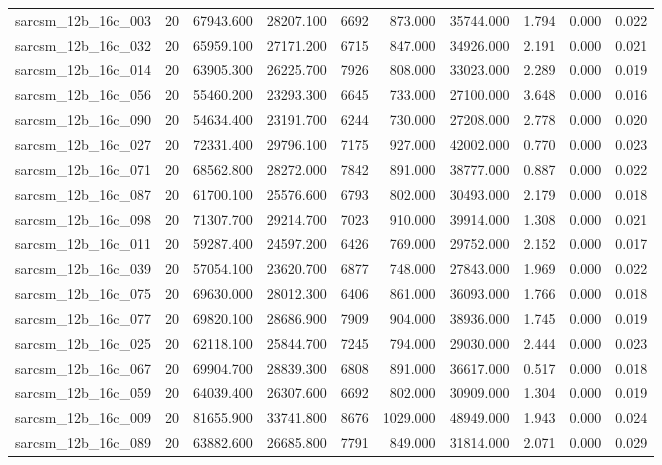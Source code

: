 \begin{tabular}{lrrrrrrrrr}
sarcsm\_12b\_16c\_003 & 20 & 67943.600 & 28207.100 & 6692 & 873.000 & 35744.000 & 1.794 & 0.000 & 0.022 \\
sarcsm\_12b\_16c\_032 & 20 & 65959.100 & 27171.200 & 6715 & 847.000 & 34926.000 & 2.191 & 0.000 & 0.021 \\
sarcsm\_12b\_16c\_014 & 20 & 63905.300 & 26225.700 & 7926 & 808.000 & 33023.000 & 2.289 & 0.000 & 0.019 \\
sarcsm\_12b\_16c\_056 & 20 & 55460.200 & 23293.300 & 6645 & 733.000 & 27100.000 & 3.648 & 0.000 & 0.016 \\
sarcsm\_12b\_16c\_090 & 20 & 54634.400 & 23191.700 & 6244 & 730.000 & 27208.000 & 2.778 & 0.000 & 0.020 \\
sarcsm\_12b\_16c\_027 & 20 & 72331.400 & 29796.100 & 7175 & 927.000 & 42002.000 & 0.770 & 0.000 & 0.023 \\
sarcsm\_12b\_16c\_071 & 20 & 68562.800 & 28272.000 & 7842 & 891.000 & 38777.000 & 0.887 & 0.000 & 0.022 \\
sarcsm\_12b\_16c\_087 & 20 & 61700.100 & 25576.600 & 6793 & 802.000 & 30493.000 & 2.179 & 0.000 & 0.018 \\
sarcsm\_12b\_16c\_098 & 20 & 71307.700 & 29214.700 & 7023 & 910.000 & 39914.000 & 1.308 & 0.000 & 0.021 \\
sarcsm\_12b\_16c\_011 & 20 & 59287.400 & 24597.200 & 6426 & 769.000 & 29752.000 & 2.152 & 0.000 & 0.017 \\
sarcsm\_12b\_16c\_039 & 20 & 57054.100 & 23620.700 & 6877 & 748.000 & 27843.000 & 1.969 & 0.000 & 0.022 \\
sarcsm\_12b\_16c\_075 & 20 & 69630.000 & 28012.300 & 6406 & 861.000 & 36093.000 & 1.766 & 0.000 & 0.018 \\
sarcsm\_12b\_16c\_077 & 20 & 69820.100 & 28686.900 & 7909 & 904.000 & 38936.000 & 1.745 & 0.000 & 0.019 \\
sarcsm\_12b\_16c\_025 & 20 & 62118.100 & 25844.700 & 7245 & 794.000 & 29030.000 & 2.444 & 0.000 & 0.023 \\
sarcsm\_12b\_16c\_067 & 20 & 69904.700 & 28839.300 & 6808 & 891.000 & 36617.000 & 0.517 & 0.000 & 0.018 \\
sarcsm\_12b\_16c\_059 & 20 & 64039.400 & 26307.600 & 6692 & 802.000 & 30909.000 & 1.304 & 0.000 & 0.019 \\
sarcsm\_12b\_16c\_009 & 20 & 81655.900 & 33741.800 & 8676 & 1029.000 & 48949.000 & 1.943 & 0.000 & 0.024 \\
sarcsm\_12b\_16c\_089 & 20 & 63882.600 & 26685.800 & 7791 & 849.000 & 31814.000 & 2.071 & 0.000 & 0.029 \\

\end{tabular}
